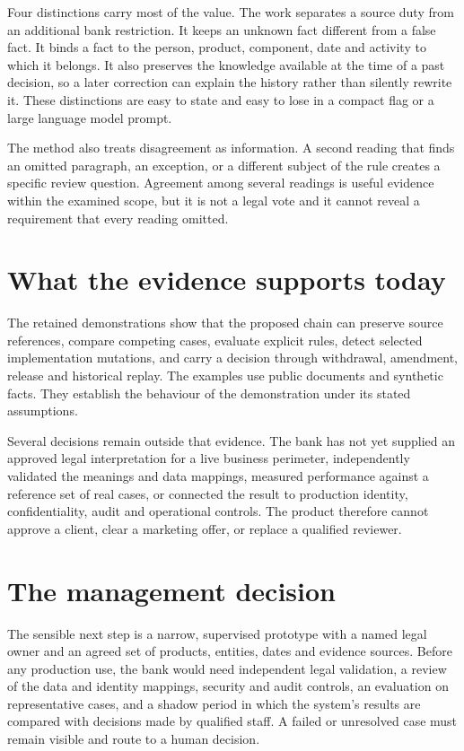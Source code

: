 \documentclass[12pt,a4paper,oneside,openany]{book}
\begin{document}
Four distinctions carry most of the value. The work separates a source duty
from an additional bank restriction. It keeps an unknown fact different from a
false fact. It binds a fact to the person, product, component, date and activity
to which it belongs. It also preserves the knowledge available at the time of a
past decision, so a later correction can explain the history rather than silently
rewrite it. These distinctions are easy to state and easy to lose in a compact
flag or a large language model prompt.

The method also treats disagreement as information. A second reading that finds
an omitted paragraph, an exception, or a different subject of the rule creates a
specific review question. Agreement among several readings is useful evidence
within the examined scope, but it is not a legal vote and it cannot reveal a
requirement that every reading omitted.

\section*{What the evidence supports today}

The retained demonstrations show that the proposed chain can preserve source
references, compare competing cases, evaluate explicit rules, detect selected
implementation mutations, and carry a decision through withdrawal, amendment,
release and historical replay. The examples use public documents and synthetic
facts. They establish the behaviour of the demonstration under its stated
assumptions.

Several decisions remain outside that evidence. The bank has not yet supplied
an approved legal interpretation for a live business perimeter, independently
validated the meanings and data mappings, measured performance against a
reference set of real cases, or connected the result to production identity,
confidentiality, audit and operational controls. The product therefore cannot
approve a client, clear a marketing offer, or replace a qualified reviewer.

\section*{The management decision}

The sensible next step is a narrow, supervised prototype with a named legal
owner and an agreed set of products, entities, dates and evidence sources. Before
any production use, the bank would need independent legal validation, a review
of the data and identity mappings, security and audit controls, an evaluation on
representative cases, and a shadow period in which the system's results are
compared with decisions made by qualified staff. A failed or unresolved case
must remain visible and route to a human decision.
\end{document}
